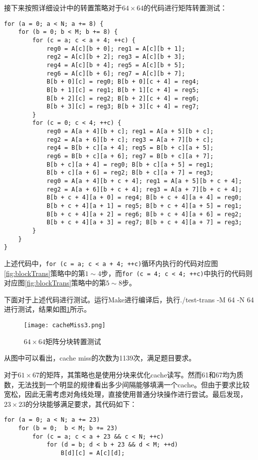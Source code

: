 \par 接下来按照详细设计中的转置策略对于$64\times 64$的代码进行矩阵转置测试：
\begin{lstlisting}
for (a = 0; a < N; a += 8) {
    for (b = 0; b < M; b += 8) {
        for (c = a; c < a + 4; ++c) {
            reg0 = A[c][b + 0]; reg1 = A[c][b + 1];
            reg2 = A[c][b + 2]; reg3 = A[c][b + 3];
            reg4 = A[c][b + 4]; reg5 = A[c][b + 5];
            reg6 = A[c][b + 6]; reg7 = A[c][b + 7];
            B[b + 0][c] = reg0; B[b + 0][c + 4] = reg4;
            B[b + 1][c] = reg1; B[b + 1][c + 4] = reg5;
            B[b + 2][c] = reg2; B[b + 2][c + 4] = reg6;
            B[b + 3][c] = reg3; B[b + 3][c + 4] = reg7;
        }
        for (c = 0; c < 4; ++c) {
            reg0 = A[a + 4][b + c]; reg1 = A[a + 5][b + c];
            reg2 = A[a + 6][b + c]; reg3 = A[a + 7][b + c];
            reg4 = B[b + c][a + 4]; reg5 = B[b + c][a + 5];
            reg6 = B[b + c][a + 6]; reg7 = B[b + c][a + 7];
            B[b + c][a + 4] = reg0; B[b + c][a + 5] = reg1;
            B[b + c][a + 6] = reg2; B[b + c][a + 7] = reg3;
            reg0 = A[a + 4][b + c + 4]; reg1 = A[a + 5][b + c + 4];
            reg2 = A[a + 6][b + c + 4]; reg3 = A[a + 7][b + c + 4];
            B[b + c + 4][a + 0] = reg4; B[b + c + 4][a + 4] = reg0;
            B[b + c + 4][a + 1] = reg5; B[b + c + 4][a + 5] = reg1;
            B[b + c + 4][a + 2] = reg6; B[b + c + 4][a + 6] = reg2;
            B[b + c + 4][a + 3] = reg7; B[b + c + 4][a + 7] = reg3;
        }
    }
}
\end{lstlisting}
\par 上述代码中，\lstinline{for (c = a; c < a + 4; ++c)}循环内执行的代码对应图\ref{fig:blockTrans}策略中的第$1\sim 4$步，而\lstinline{for (c = 4; c < 4; ++c)}中执行的代码则对应图\ref{fig:blockTrans}策略中的第$5\sim 8$步。

\par 下面对于上述代码进行测试。运行Make进行编译后，执行./test-trans -M 64 -N 64进行测试，结果如图\ref{fig:cacheMiss3}所示。
\begin{figure}[htb]
    \centering
    \texttt{[image: cacheMiss3.png]}
    \caption{$64\times 64$矩阵分块转置测试}
    \label{fig:cacheMiss3}
\end{figure}

\par 从图中可以看出，cache miss的次数为1139次，满足题目要求。

\par 对于$61\times 67$的矩阵，其策略也是使用分块来优化cache读写。然而61和67均为质数，无法找到一个明显的规律看出多少间隔能够填满一个cache。但由于要求比较宽松，因此无需考虑对角线处理，直接使用普通分块操作进行尝试。最后发现，$23\times 23$的分块能够满足要求，其代码如下：
\begin{lstlisting}
for (a = 0; a < N; a += 23)
    for (b = 0;  b < M; b += 23)
        for (c = a; c < a + 23 && c < N; ++c)
            for (d = b; d < b + 23 && d < M; ++d)
                B[d][c] = A[c][d];
\end{lstlisting}

